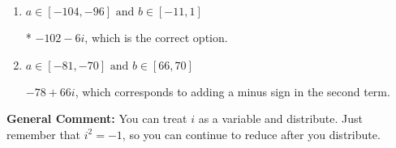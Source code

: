 \documentclass{extbook}[14pt]
\begin{document}
\begin{enumerate}
{\begin{enumerate}[label=\Alph*.]
 $-78 - 66 i$, which corresponds to adding a minus sign in the first term.
\item \( a \in [-104, -96] \text{ and } b \in [-11, 1] \)

* $-102 - 6 i$, which is the correct option.
\item \( a \in [-81, -70] \text{ and } b \in [66, 70] \)

 $-78 + 66 i$, which corresponds to adding a minus sign in the second term.
\end{enumerate}

\textbf{General Comment:} You can treat $i$ as a variable and distribute. Just remember that $i^2=-1$, so you can continue to reduce after you distribute.
}
\end{enumerate}
\end{document}
